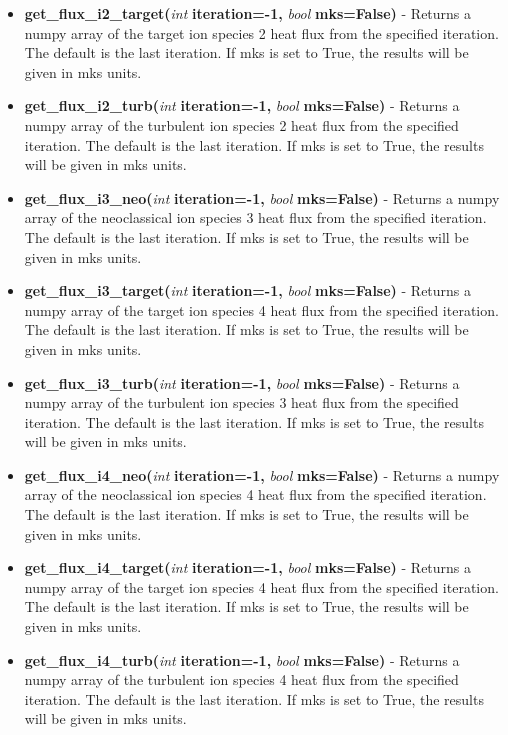 \documentclass{article}
\begin{document}
\begin{itemize}
\begin{itemize}
\item \textbf{get\_flux\_i2\_target(}\emph{int}\textbf{ iteration=-1,}\emph{ bool}\textbf{ mks=False)} - Returns a numpy array of the target ion species 2 heat flux from the specified iteration.  The default is the last iteration.  If mks is set to True, the results will be given in mks units.
\item \textbf{get\_flux\_i2\_turb(}\emph{int}\textbf{ iteration=-1,}\emph{ bool}\textbf{ mks=False)} - Returns a numpy array of the turbulent ion species 2 heat flux from the specified iteration.  The default is the last iteration.  If mks is set to True, the results will be given in mks units.
\item \textbf{get\_flux\_i3\_neo(}\emph{int}\textbf{ iteration=-1,}\emph{ bool}\textbf{ mks=False)} - Returns a numpy array of the neoclassical ion species 3 heat flux from the specified iteration.  The default is the last iteration.  If mks is set to True, the results will be given in mks units.
\item \textbf{get\_flux\_i3\_target(}\emph{int}\textbf{ iteration=-1,}\emph{ bool}\textbf{ mks=False)} - Returns a numpy array of the target ion species 4 heat flux from the specified iteration.  The default is the last iteration.  If mks is set to True, the results will be given in mks units.
\item \textbf{get\_flux\_i3\_turb(}\emph{int}\textbf{ iteration=-1,}\emph{ bool}\textbf{ mks=False)} - Returns a numpy array of the turbulent ion species 3 heat flux from the specified iteration.  The default is the last iteration.  If mks is set to True, the results will be given in mks units.
\item \textbf{get\_flux\_i4\_neo(}\emph{int}\textbf{ iteration=-1,}\emph{ bool}\textbf{ mks=False)} - Returns a numpy array of the neoclassical ion species 4 heat flux from the specified iteration.  The default is the last iteration.  If mks is set to True, the results will be given in mks units.
\item \textbf{get\_flux\_i4\_target(}\emph{int}\textbf{ iteration=-1,}\emph{ bool}\textbf{ mks=False)} - Returns a numpy array of the target ion species 4 heat flux from the specified iteration.  The default is the last iteration.  If mks is set to True, the results will be given in mks units.
\item \textbf{get\_flux\_i4\_turb(}\emph{int}\textbf{ iteration=-1,}\emph{ bool}\textbf{ mks=False)} - Returns a numpy array of the turbulent ion species 4 heat flux from the specified iteration.  The default is the last iteration.  If mks is set to True, the results will be given in mks units.

\end{itemize}
\end{itemize}
\end{document}
